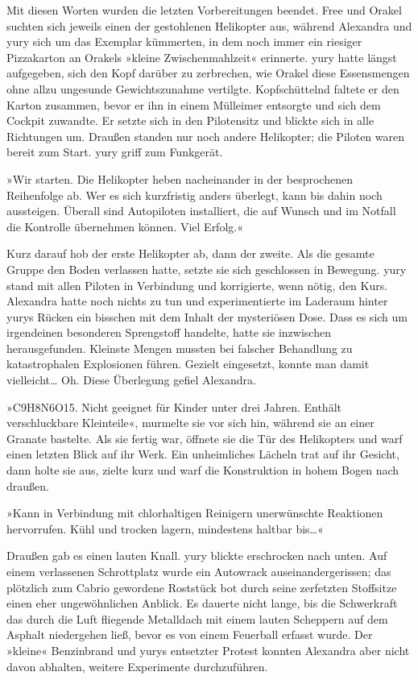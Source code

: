 Mit diesen Worten wurden die letzten Vorbereitungen beendet. Free und Orakel suchten sich jeweils einen der gestohlenen Helikopter aus, während Alexandra und yury sich um das Exemplar kümmerten, in dem noch immer ein riesiger Pizzakarton an Orakels »kleine Zwischenmahlzeit« erinnerte. yury hatte längst aufgegeben, sich den Kopf darüber zu zerbrechen, wie Orakel diese Essensmengen ohne allzu ungesunde Gewichtszunahme vertilgte. Kopfschüttelnd faltete er den Karton zusammen, bevor er ihn in einem Mülleimer entsorgte und sich dem Cockpit zuwandte. Er setzte sich in den Pilotensitz und blickte sich in alle Richtungen um. Draußen standen nur noch andere Helikopter; die Piloten waren bereit zum Start. yury griff zum Funkgerät.

»Wir starten. Die Helikopter heben nacheinander in der besprochenen Reihenfolge ab. Wer es sich kurzfristig anders überlegt, kann bis dahin noch aussteigen. Überall sind Autopiloten installiert, die auf Wunsch und im Notfall die Kontrolle übernehmen können. Viel Erfolg.«

Kurz darauf hob der erste Helikopter ab, dann der zweite. Als die gesamte Gruppe den Boden verlassen hatte, setzte sie sich geschlossen in Bewegung. yury stand mit allen Piloten in Verbindung und korrigierte, wenn nötig, den Kurs. Alexandra hatte noch nichts zu tun und experimentierte im Laderaum hinter yurys Rücken ein bisschen mit dem Inhalt der mysteriösen Dose. Dass es sich um irgendeinen besonderen Sprengstoff handelte, hatte sie inzwischen herausgefunden. Kleinste Mengen mussten bei falscher Behandlung zu katastrophalen Explosionen führen. Gezielt eingesetzt, konnte man damit vielleicht… Oh. Diese Überlegung gefiel Alexandra.

»C9H8N6O15. Nicht geeignet für Kinder unter drei Jahren. Enthält verschluckbare Kleinteile«, murmelte sie vor sich hin, während sie an einer Granate bastelte. Als sie fertig war, öffnete sie die Tür des Helikopters und warf einen letzten Blick auf ihr Werk. Ein unheimliches Lächeln trat auf ihr Gesicht, dann holte sie aus, zielte kurz und warf die Konstruktion in hohem Bogen nach draußen.

»Kann in Verbindung mit chlorhaltigen Reinigern unerwünschte Reaktionen hervorrufen. Kühl und trocken lagern, mindestens haltbar bis…«

Draußen gab es einen lauten Knall. yury blickte erschrocken nach unten. Auf einem verlassenen Schrottplatz wurde ein Autowrack auseinandergerissen; das plötzlich zum Cabrio gewordene Roststück bot durch seine zerfetzten Stoffsitze einen eher ungewöhnlichen Anblick. Es dauerte nicht lange, bis die Schwerkraft das durch die Luft fliegende Metalldach mit einem lauten Scheppern auf dem Asphalt niedergehen ließ, bevor es von einem Feuerball erfasst wurde. Der »kleine« Benzinbrand und yurys entsetzter Protest konnten Alexandra aber nicht davon abhalten, weitere Experimente durchzuführen.

